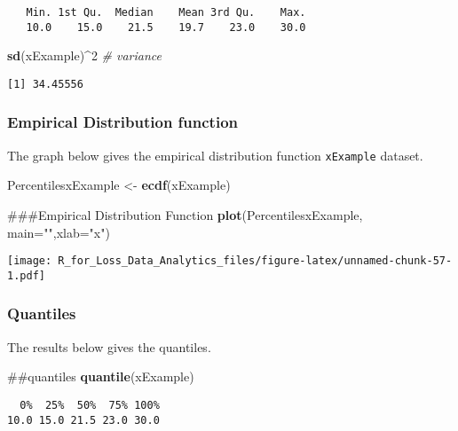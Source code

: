 \documentclass[]{book}
\newenvironment{Shaded}{\begin{snugshade}}{\end{snugshade}}
\newcommand{\KeywordTok}[1]{\textcolor[rgb]{0.13,0.29,0.53}{\textbf{#1}}}
\newcommand{\DataTypeTok}[1]{\textcolor[rgb]{0.13,0.29,0.53}{#1}}
\newcommand{\DecValTok}[1]{\textcolor[rgb]{0.00,0.00,0.81}{#1}}
\newcommand{\StringTok}[1]{\textcolor[rgb]{0.31,0.60,0.02}{#1}}
\newcommand{\CommentTok}[1]{\textcolor[rgb]{0.56,0.35,0.01}{\textit{#1}}}
\newcommand{\OperatorTok}[1]{\textcolor[rgb]{0.81,0.36,0.00}{\textbf{#1}}}
\newcommand{\NormalTok}[1]{#1}
\theoremstyle{definition}
\theoremstyle{definition}
\theoremstyle{definition}
\theoremstyle{remark}
\begin{document}
\begin{verbatim}
   Min. 1st Qu.  Median    Mean 3rd Qu.    Max. 
   10.0    15.0    21.5    19.7    23.0    30.0 
\end{verbatim}

\begin{Shaded}
\begin{Highlighting}[]
\KeywordTok{sd}\NormalTok{(xExample)}\OperatorTok{^}\DecValTok{2}   \CommentTok{# variance }
\end{Highlighting}
\end{Shaded}

\begin{verbatim}
[1] 34.45556
\end{verbatim}

\subsubsection{Empirical Distribution
function}\label{empirical-distribution-function}

The graph below gives the empirical distribution function
\texttt{xExample} dataset.

\begin{Shaded}
\begin{Highlighting}[]
\NormalTok{PercentilesxExample <-}\StringTok{ }\KeywordTok{ecdf}\NormalTok{(xExample)}

\NormalTok{###Empirical Distribution Function}
\KeywordTok{plot}\NormalTok{(PercentilesxExample, }\DataTypeTok{main=}\StringTok{""}\NormalTok{,}\DataTypeTok{xlab=}\StringTok{"x"}\NormalTok{)}
\end{Highlighting}
\end{Shaded}

\texttt{[image: R\_for\_Loss\_Data\_Analytics\_files/figure-latex/unnamed-chunk-57-1.pdf]}

\subsubsection{Quantiles}\label{quantiles}

The results below gives the quantiles.

\begin{Shaded}
\begin{Highlighting}[]
\NormalTok{##quantiles }
\KeywordTok{quantile}\NormalTok{(xExample)}
\end{Highlighting}
\end{Shaded}

\begin{verbatim}
  0%  25%  50%  75% 100% 
10.0 15.0 21.5 23.0 30.0 
\end{verbatim}
\end{document}
